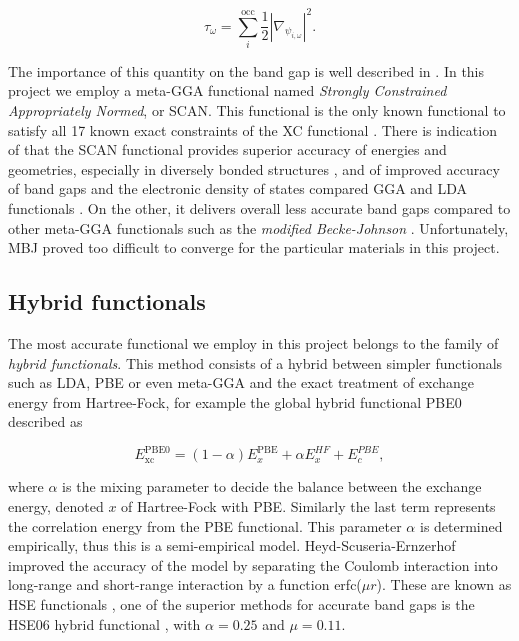 \begin{equation}
	\tau_\omega = \sum_i ^\text{occ}\frac{1}{2}|\nabla_{\psi_{i, \omega}}|^2.
\end{equation}

The importance of this quantity on the band gap is well described in \cite{xc_kineticEnergy}. In this project we employ a meta-GGA functional named \textit{Strongly Constrained Appropriately Normed}, or SCAN. This functional is the only known functional to satisfy all 17 known exact constraints of the XC functional \cite{scan}. There is indication of that the SCAN functional provides superior accuracy of energies and geometries, especially in diversely bonded structures \cite{scan_divbond}, and of improved accuracy of band gaps and the electronic density of states compared GGA and LDA functionals \cite{scan_pbe}. On the other, it delivers overall less accurate band gaps compared to other meta-GGA functionals such as the \textit{modified Becke-Johnson} \cite{mbj}. Unfortunately, MBJ proved too difficult to converge for the particular materials in this project. 

\subsection{Hybrid functionals}
The most accurate functional we employ in this project belongs to the family of \textit{hybrid functionals}. This method consists of a hybrid between simpler functionals such as LDA, PBE or even meta-GGA and the exact treatment of exchange energy from Hartree-Fock, for example the global hybrid functional PBE0 \cite{pbe0} described as

\begin{equation}
E_\text{xc} ^\text{PBE0} = (1-\alpha)E_x ^\text{PBE} + \alpha E_x ^{HF} + E_c ^{PBE}, 
\end{equation}

 where $\alpha$ is the mixing parameter to decide the balance between the exchange energy, denoted $x$ of Hartree-Fock with PBE. Similarly the last term represents the correlation energy from the PBE functional. This parameter $\alpha$ is determined empirically, thus this is a semi-empirical model. Heyd-Scuseria-Ernzerhof improved the accuracy of the model by separating the Coulomb interaction into long-range and short-range interaction by a function erfc($\mu r$). These are known as HSE functionals \cite{hse}, one of the superior methods for accurate band gaps is the HSE06 hybrid functional \cite{hse06}, with $\alpha = 0.25$ and $\mu = 0.11$.  
 
